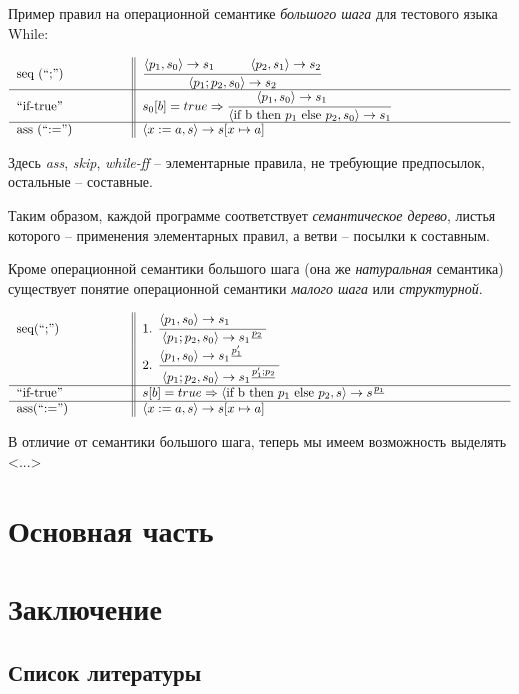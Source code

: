 \documentclass[aps,12pt,final,oneside,onecolumn,musixtex,superscriptaddress,centertags]{article}
\begin{document}
    Пример правил на операционной семантике \emph{большого шага} для тестового языка \large{While}:

    \begin{align*}
       \begin{tabular}{ p{3cm} || p{10cm} }
          seq (``;'')  & $\seqns$    \\
          \hline
          ``if-true''  & $\iftruens$ \\
          \hline
          ass (``:='') & $\assignns$ \\
       \end{tabular}
    \end{align*}

    Здесь \emph{ass}, \emph{skip}, \emph{while-ff} -- элементарные правила, не требующие предпосылок, остальные -- составные.

    Таким образом, каждой программе соответствует \emph{семантическое дерево}, листья которого -- применения элементарных правил, а ветви -- посылки к составным.

    Кроме операционной семантики большого шага (она же \emph{натуральная} семантика) существует понятие операционной семантики \emph{малого шага} или \emph{структурной}. 

    \begin{align*}
       \begin{tabular}{ p{3cm} || p{10cm} }
          seq(``;'')  & 1. $\seqssn$ \\
                      & 2. $\seqssj$ \\
          \hline
          ``if-true'' & $\iftruess$  \\
          \hline
          ass(``:='') & $\assignns$  \\
       \end{tabular}
    \end{align*}

    В отличие от семантики большого шага, теперь мы имеем возможность выделять <...>

  \newpage

  \section{Основная часть}
  \newpage

  \section{Заключение}

  \subsection{Список литературы}
  
  
\end{document}
